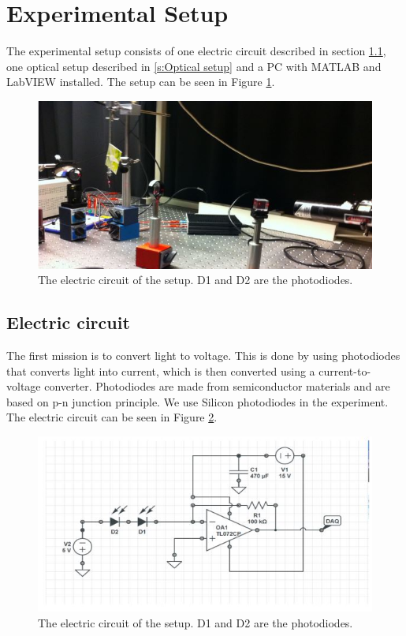 \documentclass[11pt, a4paper]{article}
\begin{document}
\section{Experimental Setup}
The experimental setup consists of one electric circuit described in section 
\ref{s:Electric circuit}, one optical setup described in \ref{s:Optical setup} and 
a PC with MATLAB and LabVIEW installed. 
The setup can be seen in Figure \ref{f:setup}. 

\begin{figure}[h]
	\centering
	\includegraphics{setup}
	\caption{The electric circuit of the setup. D1 and D2 are the photodiodes.}
	\label{f:setup}
\end{figure}

\subsection{Electric circuit}
\label{s:Electric circuit}
The first mission is to convert light to voltage. This is done by using photodiodes 
that converts light into current, which is then converted using a
current-to-voltage converter.
Photodiodes are made from semiconductor materials and are based on p-n junction 
principle. We use Silicon photodiodes in the experiment. The electric circuit can 
be seen in Figure \ref{f:circuit}.
\begin{figure}[h]
	\centering
	\includegraphics{circuit}
	\caption{The electric circuit of the setup. D1 and D2 are the photodiodes.}
	\label{f:circuit}
\end{figure}
\end{document}
